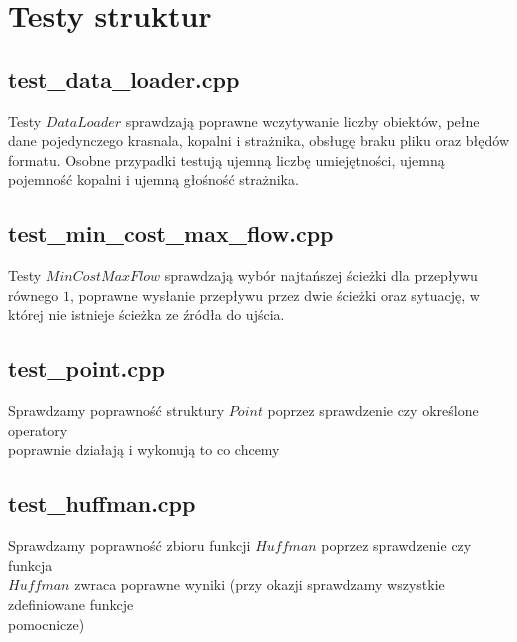 \documentclass{article}
\begin{document}
\section{Testy struktur}

\subsection{test\_data\_loader.cpp}
Testy $DataLoader$ sprawdzają poprawne wczytywanie liczby obiektów, pełne dane pojedynczego krasnala, kopalni i strażnika, obsługę braku pliku oraz błędów formatu. Osobne przypadki testują ujemną liczbę umiejętności, ujemną pojemność kopalni i ujemną głośność strażnika.


\subsection{test\_min\_cost\_max\_flow.cpp}
Testy $MinCostMaxFlow$ sprawdzają wybór najtańszej ścieżki dla przepływu równego $1$, poprawne wysłanie przepływu przez dwie ścieżki oraz sytuację, w której nie istnieje ścieżka ze źródła do ujścia.


\subsection{test\_point.cpp}
Sprawdzamy poprawność struktury $Point$ poprzez sprawdzenie czy określone operatory \\ poprawnie działają i wykonują to co chcemy



\subsection{test\_huffman.cpp}
Sprawdzamy poprawność zbioru funkcji $Huffman$ poprzez sprawdzenie czy funkcja \\ $Huffman$ zwraca poprawne wyniki (przy okazji sprawdzamy wszystkie zdefiniowane funkcje \\ pomocnicze)


\end{document}
